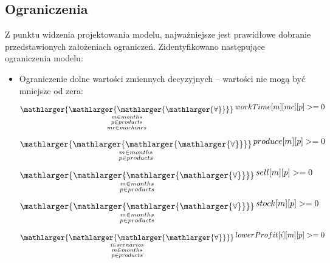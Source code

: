\documentclass[11pt,a4paper]{article}
\newcommand\bigforall{%
  \mathop{\lower0.75ex\hbox{\ensuremath{%
    \mathlarger{\mathlarger{\mathlarger{\mathlarger{\forall}}}}}}}%
  \limits}
\begin{document}
\subsection{Ograniczenia}
Z punktu widzenia projektowania modelu, najważniejsze jest prawidłowe dobranie przedstawionych założeniach ograniczeń. Zidentyfikowano następujące ograniczenia modelu:
\begin{itemize}
\item Ograniczenie dolne wartości zmiennych decyzyjnych – wartości nie mogą być mniejsze od zera:
	\begin{equation}
	\bigforall_{\substack{
			m \in months \\ 
			p \in products \\
			mc \in machines}} workTime[m][mc][p] >=0
	\end{equation}
	\begin{equation}
	\bigforall_{\substack{
			m \in months \\ 
			p \in products}} produce[m][p] >=0
	\end{equation}
	\begin{equation}
	\bigforall_{\substack{
			m \in months \\ 
			p \in products}} sell[m][p] >=0
	\end{equation}
	\begin{equation}
	\bigforall_{\substack{
			m \in months \\ 
			p \in products}} stock[m][p] >=0
	\end{equation}
	\begin{equation}
	\bigforall_{\substack{
			i \in scenarios \\
			m \in months \\ 
			p \in products}} lowerProfit[i][m][p] >=0
	\end{equation}


\end{itemize}
\end{document}
